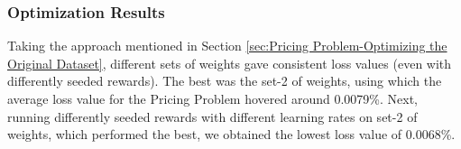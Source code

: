 \documentclass[12pt]{article}
\begin{document}
    \subsubsection{Optimization Results} \label{sec:PriProbRes - Optimization}
    Taking the approach mentioned in Section \ref{sec:Pricing Problem-Optimizing the Original Dataset}, different sets of weights gave consistent loss values (even with differently seeded rewards). The best was the set-2 of weights, using which the average loss value for the Pricing Problem hovered around 0.0079\%. Next, running differently seeded rewards with different learning rates on set-2 of weights, which performed the best, we obtained the lowest loss value of 0.0068\%.
\end{document}
